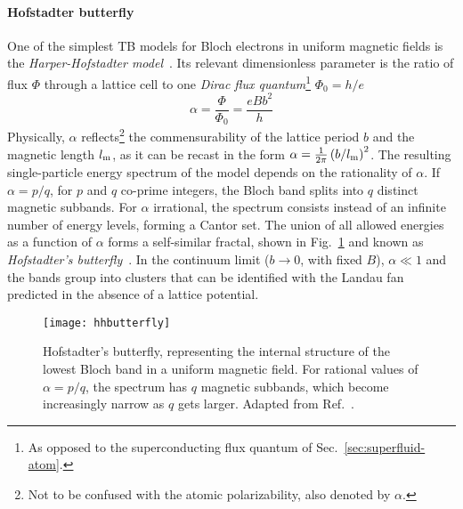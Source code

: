 \paragraph{Hofstadter butterfly}
One of the simplest TB models for Bloch electrons in uniform magnetic
fields is the \textit{Harper-Hofstadter
  model}~\cite{harper1955magnetic,hofstadter1976butterfly}. Its
relevant dimensionless parameter is the ratio of flux $\Phi$ through a
lattice cell to one \textit{Dirac flux quantum}\footnote{As opposed to
  the superconducting flux quantum of Sec.~\ref{sec:superfluid-atom}.}
$\Phi_0=h/e$
%
\begin{equation}\label{eq:alpha}
  \alpha = \frac{\Phi}{\Phi_0} = \frac{eBb^2}{h}
\end{equation}
% 
Physically, $\alpha$ reflects\footnote{Not to be confused with the
  atomic polarizability, also denoted by $\alpha$.} the
commensurability of the lattice period $b$ and the magnetic length
$l_{\text{m}}$, as it can be recast in the form
$\alpha = \frac{1}{2\pi}\left(b/l_{\text{m}}\right)^2$.  The resulting
single-particle energy spectrum of the model depends on the
rationality of $\alpha$. If $\alpha = p/q$, for $p$ and $q$ co-prime
integers, the Bloch band splits into $q$ distinct magnetic
subbands. For $\alpha$ irrational, the spectrum consists instead of an
infinite number of energy levels, forming a Cantor set. The union of
all allowed energies as a function of $\alpha$ forms a self-similar
fractal, shown in Fig.~\ref{fig:butterfly} and known as
\textit{Hofstadter’s butterfly}~\cite{hofstadter1976butterfly}. In the
continuum limit ($b \rightarrow 0$, with fixed $B$), $\alpha \ll 1$
and the bands group into clusters that can be identified with the
Landau fan predicted in the absence of a lattice potential.
%
\begin{figure}[tb]\centering
  \texttt{[image: hhbutterfly]}
  \caption{
    Hofstadter's butterfly, representing the internal structure of the
    lowest Bloch band in a uniform magnetic field. For rational values of $\alpha
    = p/q$, the spectrum has $q$ magnetic subbands, which become
    increasingly narrow as $q$ gets larger. Adapted from
    Ref.~\cite{hofstadter1976butterfly}.
  }\label{fig:butterfly}
\end{figure}
% 

